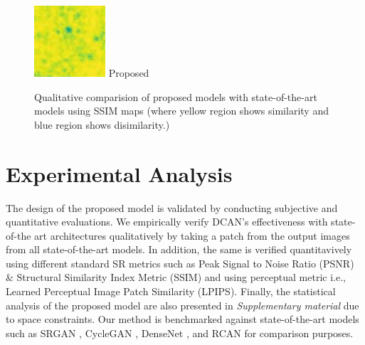 \documentclass[conference]{IEEEtran}
\begin{document}
\begin{figure}[!t]
        \vfill
        \includegraphics[width=\linewidth]{Figures/983/983_proposed_ssim.jpg}
        Proposed
    \endminipage\hfill
    \caption{Qualitative comparision of proposed models with state-of-the-art models using SSIM maps (where yellow region shows similarity and blue region shows disimilarity.)}
    \label{fig:qualanal}
\end{figure}

\section{Experimental Analysis}
The design of the proposed model is validated by conducting subjective and quantitative evaluations. We empirically verify DCAN’s effectiveness %
with state-of-the art architectures qualitatively by taking a patch from the output images from all state-of-the-art models. In addition, the same is verified quantitavively using different standard SR metrics such as Peak Signal to Noise Ratio (PSNR) \& Structural Similarity Index Metric (SSIM) and using perceptual metric i.e., Learned Perceptual Image Patch Similarity (LPIPS).  Finally, the statistical analysis of the proposed model are also presented in \emph{Supplementary material} due to space constraints. Our method is benchmarked against state-of-the-art models such as SRGAN \cite{SRGAN}, CycleGAN \cite{CycleGAN}, DenseNet \cite{SRDensenet}, and RCAN \cite{RCAN} for comparison purposes.  
\end{document}
